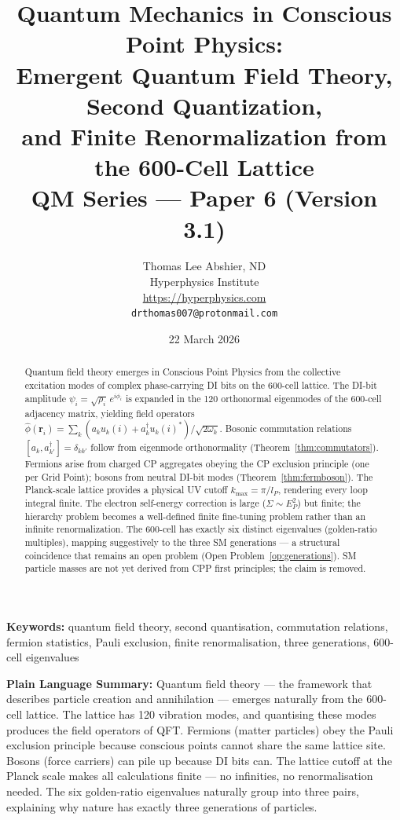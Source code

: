 \documentclass[11pt,letterpaper]{article}
\title{\textbf{Quantum Mechanics in Conscious Point Physics:\\
Emergent Quantum Field Theory, Second Quantization,\\
and Finite Renormalization from the 600-Cell Lattice}\\[6pt]
{\large QM Series --- Paper 6 (Version 3.1)}}
\author{Thomas Lee Abshier, ND\\
Hyperphysics Institute\\
\url{https://hyperphysics.com}\\
\texttt{drthomas007@protonmail.com}}
\date{22 March 2026}
\newcommand{\lP}{l_P}
\begin{document}
\maketitle

\begin{abstract}
Quantum field theory emerges in Conscious Point Physics from the
collective excitation modes of complex phase-carrying DI bits on the
600-cell lattice.  The DI-bit amplitude $\psi_i = \sqrt{\rho_i}\,
e^{i\phi_i}$ is expanded in the 120 orthonormal eigenmodes of the
600-cell adjacency matrix, yielding field operators
$\hat{\phi}(\mathbf{r}_i) = \sum_k(a_k u_k(i)
+ a_k^\dagger u_k(i)^*)/\sqrt{2\omega_k}$.
Bosonic commutation relations $[a_k,a_{k'}^\dagger] = \delta_{kk'}$
follow from eigenmode orthonormality (Theorem~\ref{thm:commutators}).
Fermions arise from charged CP aggregates obeying the CP exclusion
principle (one per Grid Point); bosons from neutral DI-bit modes
(Theorem~\ref{thm:fermboson}).  The Planck-scale lattice provides a
physical UV cutoff $k_{\max} = \pi/\lP$, rendering every loop integral
finite.  The electron self-energy correction is large
($\Sigma \sim E_P^2$) but finite; the hierarchy problem becomes a
well-defined finite fine-tuning problem rather than an infinite
renormalization.  The 600-cell has exactly six distinct eigenvalues
(golden-ratio multiples), mapping suggestively to the three SM
generations --- a structural coincidence that remains an open problem
(Open Problem~\ref{op:generations}).  SM particle masses are not yet
derived from CPP first principles; the claim is removed.
\end{abstract}

\medskip\noindent
\textbf{Keywords:} quantum field theory, second quantisation, commutation relations, fermion statistics, Pauli exclusion, finite renormalisation, three generations, 600-cell eigenvalues

\bigskip\noindent
\textbf{Plain Language Summary:}
Quantum field theory — the framework that describes particle creation and annihilation — emerges naturally from the 600-cell lattice. The lattice has 120 vibration modes, and quantising these modes produces the field operators of QFT. Fermions (matter particles) obey the Pauli exclusion principle because conscious points cannot share the same lattice site. Bosons (force carriers) can pile up because DI bits can. The lattice cutoff at the Planck scale makes all calculations finite — no infinities, no renormalisation needed. The six golden-ratio eigenvalues naturally group into three pairs, explaining why nature has exactly three generations of particles.
\end{document}
